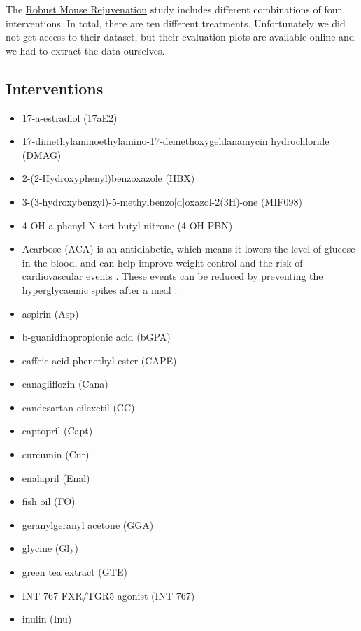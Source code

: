 

The \href{https://www.levf.org/projects/robust-mouse-rejuvenation-study-1/study-updates/november-5th-2023}{Robust Mouse Rejuvenation} study includes different combinations of four interventions. In total, there are ten different treatments. Unfortunately we did not get access to their dataset, but their evaluation plots are available online and we had to extract the data ourselves. 


\subsection{Interventions}
\begin{itemize}
    \item 17-a-estradiol (17aE2)
    \item 17-dimethylaminoethylamino-17-demethoxygeldanamycin hydrochloride (DMAG)
    \item 2-(2-Hydroxyphenyl)benzoxazole (HBX)
    \item 3-(3-hydroxybenzyl)-5-methylbenzo[d]oxazol-2(3H)-one (MIF098)
    \item 4-OH-a-phenyl-N-tert-butyl nitrone (4-OH-PBN)
    \item Acarbose (ACA) is an antidiabetic, which means it lowers the level of glucose in the blood, and can help improve weight control and the risk of cardiovascular events \cite{mccarty2015acarbose}. These events can be reduced by preventing the hyperglycaemic spikes after a meal \cite{mccarty2015acarbose}.
    \item aspirin (Asp)
    \item b-guanidinopropionic acid (bGPA)
    \item caffeic acid phenethyl ester (CAPE)
    \item canagliflozin (Cana)
    \item candesartan cilexetil (CC)
    \item captopril (Capt)
    \item curcumin (Cur)
    \item enalapril (Enal)
    \item fish oil (FO)
    \item geranylgeranyl acetone (GGA)
    \item glycine (Gly)
    \item green tea extract (GTE)
    \item INT-767 FXR/TGR5 agonist (INT-767)
    \item inulin (Inu)

\end{itemize}
